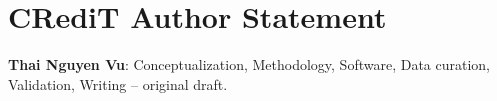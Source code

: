 \section*{CRediT Author Statement}
\textbf{Thai Nguyen Vu}: Conceptualization, Methodology, Software, Data curation, Validation,
Writing -- original draft. 
